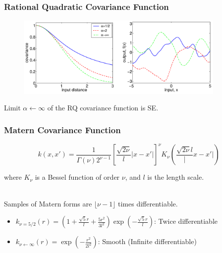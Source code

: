 \documentclass[10pt]{beamer}
\begin{document}
  \begin{frame}
    \frametitle{Rational Quadratic Covariance Function}

    \begin{figure}
      \centering
      \includegraphics[width=0.9\textwidth]{rationalCovFunc.png}
    \end{figure}

    \begin{center}
      Limit $\alpha \leftarrow \infty$ of the RQ covariance function is SE.
    \end{center}
  \end{frame}

  \begin{frame}
    \frametitle{Matern Covariance Function}

    \begin{equation*}
      k(x,x') = \frac{1}{\Gamma(\nu) 2^{\nu - 1}} \left[ \frac{\sqrt{2 \nu}}{l} |x - x'| \right]^{\nu} K_{\nu} \left( \frac{\sqrt{2 \nu}{l}} |x - x'| \right)
    \end{equation*}

    where $K_{\nu}$ is a Bessel function of order $\nu$, and $l$ is the length scale.\\~

    \pause

    Samples of Matern forms are $\lfloor \nu - 1 \rfloor$ times differentiable.

    \begin{itemize}
      \item $k_{\nu = 5/2} (r) = \left( 1 + \frac{\sqrt{5}r}{l} + \frac{5 r^2}{3 l^2} \right) \exp \left( - \frac{\sqrt{5}r}{l} \right)$: Twice differentiable
      \item $k_{\nu \leftarrow \infty} (r) = \exp \left( - \frac{r^2}{2 l^2} \right)$: Smooth (Infinite differentiable)
    \end{itemize}
  \end{frame}
\end{document}
